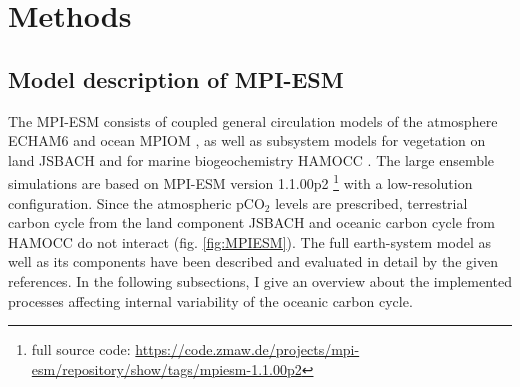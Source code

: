 \chapter{Methods}
\label{ch:methods}
\section{Model description of MPI-ESM}

The \acf{MPI-ESM} 
consists of coupled general circulation models of the atmosphere \acs{ECHAM}6 \citep{Stevens2013} and ocean \acs{MPIOM} \citep{Jungclaus2013}, as well as subsystem models for vegetation on land JSBACH \citep{Reick2013} and for marine biogeochemistry \acs{HAMOCC} \citep{Ilyina2013}. The large ensemble simulations are based on \acs{MPI-ESM} version 1.1.00p2 \footnote[1]{full source code: \url{https://code.zmaw.de/projects/mpi-esm/repository/show/tags/mpiesm-1.1.00p2}} with a low-resolution configuration. Since the atmospheric pCO$_2$ levels are prescribed, terrestrial carbon cycle from the land component JSBACH and oceanic carbon cycle from \acs{HAMOCC} do not interact (fig. \ref{fig:MPIESM}). The full earth-system model \citep{Giorgetta2013} as well as its components have been described and evaluated in detail by the given references. In the following subsections, I give an overview about the implemented processes affecting internal variability of the oceanic carbon cycle.





